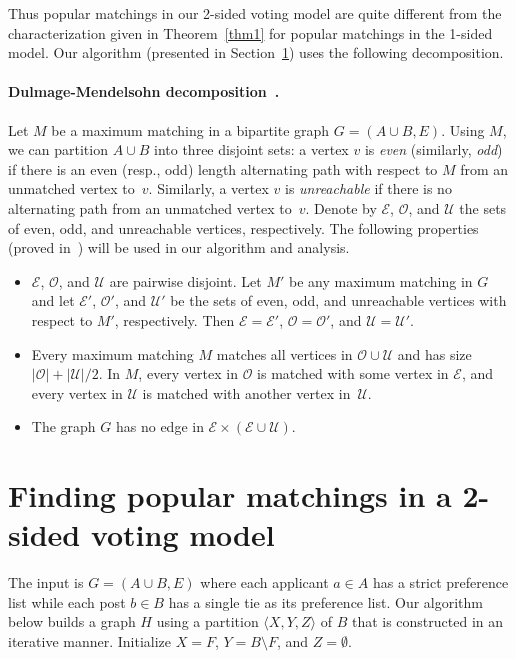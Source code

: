 \documentclass[11pt]{llncs}
\begin{document}
Thus popular matchings in our 2-sided voting model are quite different from the 
characterization given in Theorem~\ref{thm1} for popular matchings in the 1-sided model. Our 
algorithm (presented in Section~\ref{sec:algo}) uses the following decomposition.

\paragraph{Dulmage-Mendelsohn decomposition~\cite{dulmage}.} Let $M$ be a maximum matching in 
a bipartite graph $G = (A \cup B, E)$. Using $M$, we can partition $A \cup B$ into three 
disjoint sets: a vertex $v$ is \emph {even} (similarly, \emph {odd}) if there is an even 
(resp., odd) length alternating path with respect to $M$ from an unmatched vertex to~$v$.
Similarly, a vertex $v$ is \emph {unreachable} if there is no alternating path from an 
unmatched vertex to~$v$. Denote by $\mathcal E$, $\mathcal O$, and $\mathcal U$ the sets of 
even, odd, and unreachable vertices, respectively. The following properties (proved 
in~\cite{GGL95}) will be used in our algorithm and analysis.
\begin{itemize}
\item $\mathcal E$, $\mathcal O$, and $\mathcal U$ are pairwise disjoint. Let $M'$ be any
maximum matching in $G$ and let $\mathcal E'$, $\mathcal O'$, and $\mathcal U'$ be the sets 
of even, odd, and unreachable vertices with respect to $M'$, respectively. Then ${\mathcal E} 
= {\mathcal E'}$, ${\mathcal O} = {\mathcal O'}$, and ${\mathcal U} = {\mathcal U'}$.
\item Every maximum matching $M$ matches all vertices in ${\mathcal O} \cup {\mathcal U}$ and 
has size $|{\mathcal O}| + |{\mathcal U}|/2$. In $M$, every vertex in $\mathcal O$ is matched 
with some vertex in $\mathcal E$, and every vertex in $\mathcal U$ is matched with another 
vertex in~$\mathcal U$. 
\item The graph $G$ has no edge in ${\mathcal E}\times({\mathcal E}\cup{\mathcal U})$.
\end{itemize}

\section{Finding popular matchings in a 2-sided voting model}
\label{sec:algo}
The input is $G = (A\cup B, E)$ where each applicant $a \in A$ has a strict preference list 
while each post $b \in B$ has a single tie as its preference list. Our algorithm below builds 
a graph $H$ using a partition $\langle X,Y,Z\rangle$ of $B$ that is 
constructed in an iterative manner.
Initialize $X = F$, $Y = B \setminus F$, and $Z = \emptyset$. 
\end{document}
